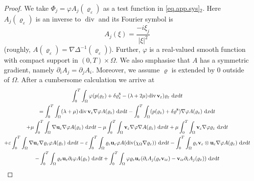 \documentclass{article}
\DeclareMathOperator{\diver}{div}
\newcommand{\bu}{{\bf u}}
\newcommand{\vu}{\bu}
\newcommand{\bv}{{\bf v}}
\newcommand{\vv}{\bv}
\newcommand{\pat}{\partial_t}
\numberwithin{equation}{section}
\begin{document}
\begin{proof}
We take $\Phi_j = \varphi A_j(\varrho_\varepsilon)$ as a test function in \eqref{eq.app.sys}$_2$. Here $A_j(\varrho_\varepsilon)$ is an inverse to $\diver $ and its Fourier symbol is
$$
A_j(\xi) = \frac{-i \xi_j}{|\xi|^2}
$$
(roughly, $A(\varrho_\varepsilon) = \nabla \Delta^{-1} (\varrho_\varepsilon)$).  Further, $\varphi$ is a real-valued smooth function with compact support in $(0,T)\times \Omega$. We also smphasise that $A$ has a symmetric gradient, namely $\partial_i A_j = \partial_j A_i$. Moreover, we assume $\varrho$ is extended by $0$ outside of $\Omega$. After a cumbersome calculation we arrive at%
\begin{multline}
\int_0^T \int_\Omega \varphi (p(\varrho_\varepsilon) + \delta \varrho_\varepsilon^8 - (\lambda + 2\mu)\diver \vv_\varepsilon)\varrho_\varepsilon \ {\rm d}x{\rm d}t\\
\label{rovnice.410}%
 = \int_0^T\int_\Omega (\lambda+ \mu) \diver \vv_\varepsilon \nabla \varphi A(\varrho_\varepsilon)\ {\rm d}x{\rm d}t - \int_0^T\int_\Omega (p(\varrho_\varepsilon) + \delta \varrho^8)\nabla \varphi A(\varrho_\varepsilon)\ {\rm d}x{\rm d}t\\
%
 + \mu \int_0^T \int_\Omega \nabla \vu_\varepsilon \nabla \varphi A(\varrho_\varepsilon)\ {\rm d}x{\rm d}t - \mu \int_0^T \int_\Omega \vv_\varepsilon \nabla \varphi \nabla A(\varrho_\varepsilon) \ {\rm d}x{\rm d}t + \mu \int_0^T \int_\Omega  \vv_\varepsilon \nabla \varphi \varrho_\varepsilon \ {\rm d}x{\rm d}t\\
%
+ \varepsilon \int_0^T\int_\Omega \nabla \vu_\varepsilon \nabla \varrho_\varepsilon \varphi A(\varrho_\varepsilon)\ {\rm d}x{\rm d}t - \varepsilon \int_0^T\int_\Omega \varrho_\varepsilon \vu_\varepsilon \varphi A(\diver (\chi_\Omega \nabla \varrho_\varepsilon)) \ {\rm d}x{\rm d}t - \int_0^T\int_\Omega \varrho_\varepsilon \vv_\varepsilon \otimes \vu_\varepsilon \nabla \varphi A(\varrho_\varepsilon)\ {\rm d}x{\rm d}t\\
%
-\int_0^T\int_\Omega \varrho_\varepsilon \vu_\varepsilon \pat \varphi A(\varrho_\varepsilon)\ {\rm d}x{\rm d}t
+\int_0^T\int_\Omega \varphi \varrho_\varepsilon \vu_\varepsilon (\partial_i A_j(\varrho_\varepsilon \vv_{i\varepsilon}) - \vv_{i\varepsilon}\partial_i A_j(\varrho_\varepsilon))\ {\rm d}x{\rm d}t
\end{multline}


\end{proof}
\end{document}
